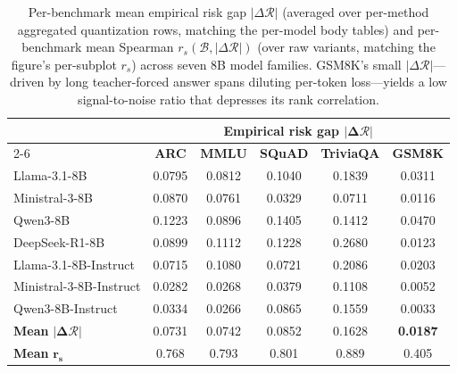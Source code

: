 \begin{table}[t]
\centering
\caption{Per-benchmark mean empirical risk gap $|\Delta\mathcal{R}|$ (averaged over per-method aggregated quantization rows, matching the per-model body tables) and per-benchmark mean Spearman $r_s(\mathcal{B},|\Delta\mathcal{R}|)$ (over raw variants, matching the figure's per-subplot $r_s$) across seven 8B model families. GSM8K's small $|\Delta\mathcal{R}|$---driven by long teacher-forced answer spans diluting per-token loss---yields a low signal-to-noise ratio that depresses its rank correlation.}
\label{tab:gsm8k_outlier}
\setlength{\tabcolsep}{5pt}
\begin{tabular}{l ccccc}
\toprule
 & \multicolumn{5}{c}{\textbf{Empirical risk gap} $\boldsymbol{|\Delta\mathcal{R}|}$} \\
\cmidrule(lr){2-6}
\multicolumn{1}{c}{\textbf{Model}} & \textbf{ARC} & \textbf{MMLU} & \textbf{SQuAD} & \textbf{TriviaQA} & \textbf{GSM8K} \\
\midrule
Llama-3.1-8B & 0.0795 & 0.0812 & 0.1040 & 0.1839 & 0.0311 \\
Ministral-3-8B & 0.0870 & 0.0761 & 0.0329 & 0.0711 & 0.0116 \\
Qwen3-8B & 0.1223 & 0.0896 & 0.1405 & 0.1412 & 0.0470 \\
DeepSeek-R1-8B & 0.0899 & 0.1112 & 0.1228 & 0.2680 & 0.0123 \\
Llama-3.1-8B-Instruct & 0.0715 & 0.1080 & 0.0721 & 0.2086 & 0.0203 \\
Ministral-3-8B-Instruct & 0.0282 & 0.0268 & 0.0379 & 0.1108 & 0.0052 \\
Qwen3-8B-Instruct & 0.0334 & 0.0266 & 0.0865 & 0.1559 & 0.0033 \\
\midrule
\textbf{Mean} $\boldsymbol{|\Delta\mathcal{R}|}$ & 0.0731 & 0.0742 & 0.0852 & 0.1628 & \cellcolor{red!18} \textbf{0.0187} \\
\midrule
\textbf{Mean} $\boldsymbol{r_s}$ & 0.768 & 0.793 & 0.801 & 0.889 & \cellcolor{red!18} 0.405 \\
\bottomrule
\end{tabular}
\end{table}